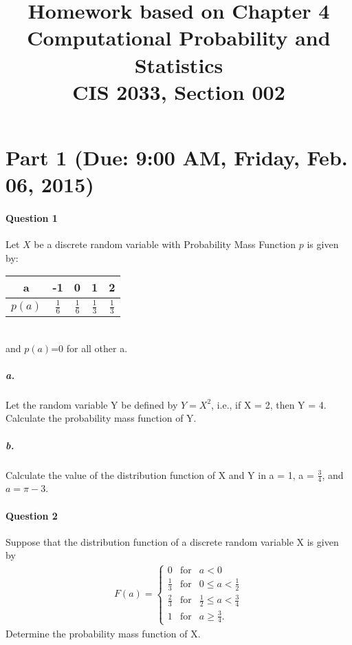 \documentclass[11pt]{article} %
\title{Homework based on Chapter 4\\
Computational Probability and Statistics \\
CIS 2033, Section 002}
\author{}
\date{} %
\begin{document}
\maketitle

\section{Part 1 (Due: 9:00 AM, Friday, Feb. 06, 2015)}

\paragraph*{\bf Question 1}
Let $X$ be a discrete random variable with Probability Mass Function $p$ is given by: \\
\begin{table}[h!]
\begin{center}
\begin{tabular}{c|cccc} \hline
a & -1 & 0 & 1 & 2 \\ \hline
$p(a)$ & $\frac{1}{6}$ & $\frac{1}{6}$ & $\frac{1}{3}$ & $\frac{1}{3}$ \\ \hline
\end{tabular}
\label{ta1}
\end{center}
\end{table}
\\ and $p(a)$=0 for all other a. 

\subparagraph*{a.} Let the random variable Y be defined by $Y=X^2$, i.e., if X = 2, then Y = 4. Calculate the probability mass function of Y. 
\subparagraph*{b.} Calculate the value of the distribution function of X and Y in a = 1, a = $\frac{3}{4}$, and $a=\pi - 3$. 


\paragraph*{\bf Question 2}
Suppose that the distribution function of a discrete random variable X is given by 
\begin{align*}
F(a) = \left\{ 
\begin{array}{rcl}
0 & \mbox{for} & a < 0\\
\frac{1}{3} & \mbox{for} & 0 \leq a < \frac{1}{2} \\
\frac{2}{3} & \mbox{for} & \frac{1}{2} \leq a < \frac{3}{4} \\
1 & \mbox{for} & a \geq \frac{3}{4}.
\end{array} \right.
\end{align*}
Determine the probability mass function of X. 
\vspace{8em}
\end{document}
